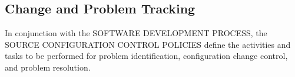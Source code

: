 \subsection{Change and Problem Tracking}
In conjunction with the SOFTWARE DEVELOPMENT PROCESS, the SOURCE CONFIGURATION
CONTROL POLICIES define the activities and tasks to be performed for problem
identification, configuration change control, and problem resolution.

